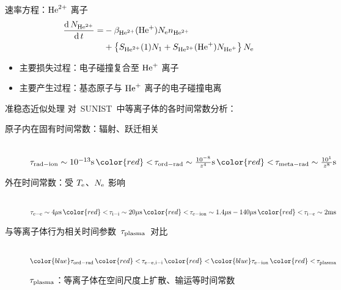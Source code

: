 \begin{CJK*}{UTF8}{kai}
\begin{frame}{速率方程：${\rm He}^{2+}$ 离子}
	\[
	\begin{aligned}
		\frac{{\rm d}\,N_{{\rm He}^{2+}}}{{\rm d}\,t}=
			&-\beta_{{\rm He}^{2+}}({\rm He}^{+})N_{\rm e}n_{{\rm He}^{2+}}\\
			&+\left\{S_{{\rm He}^{2+}}(1)N_1+S_{{\rm He}^{2+}}({\rm He}^+)N_{{\rm He}^+}\right\}N_{\rm e}
	\end{aligned}
	\]
	\begin{itemize}
		\item 主要损失过程：电子碰撞复合至 ${\rm He}^+$ 离子
		\item 主要产生过程：基态原子与 ${\rm He}^+$ 离子的电子碰撞电离
	\end{itemize}
\end{frame}



\begin{frame}{准稳态近似处理}
	对~SUNIST~中等离子体的各时间常数分析：
	\begin{description}
		\item[原子内在固有时间常数：辐射、跃迁相关]
			\quad\\
			\hspace{-3em}
			$\tau_{\rm rad-ion}\sim 10^{-13}{\rm s}\,{\color{red} <}\,
			\tau_{\rm ord-rad}\sim \frac{10^{-8}}{z^4}{\rm s}\,{\color{red} <}\,
			\tau_{\rm meta-rad}\sim \frac{10^{1}}{z^8}{\rm s}$
		\item[外在时间常数：受 $T_{\rm e}$、$N_{\rm e}$ 影响]
			\quad\\
			\hspace{-3em}
			$\tau_{\rm e-e}\sim 4 {\rm \mu s}\,{\color{red} <}\,
            \tau_{\rm i-i}\sim 20 {\rm \mu s}\,{\color{red} <}\,
            \tau_{\rm e-ion}\sim 1.4 {\rm \mu s} - 140 {\rm \mu s}\,{\color{red} <}\,
            \tau_{\rm i-e}\sim 2 {\rm ms}$
		\item[与等离子体行为相关时间参数~$\tau_{\rm{plasma}}$~对比]
			\quad\\
			\hspace{-3em}
			${\color{blue}\tau_{\rm ord-rad}} \,{\color{red} <}\,
            \tau_{\rm e-e,i-i} \,{\color{red} <}\,
            {\color{blue}\tau_{\rm e-ion}} \,{\color{red} <}\,
            \tau_{\rm plasma}$%

			$\tau_{\rm{plasma}}$：等离子体在空间尺度上扩散、输运等时间常数
	\end{description}
	

\end{frame}
\end{CJK*}
